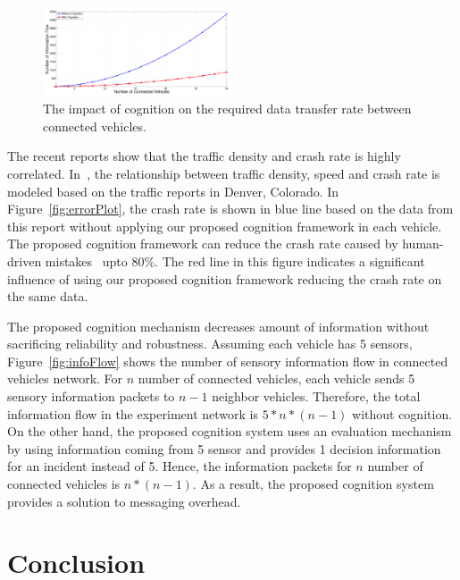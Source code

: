 \documentclass[journal, 11pt]{IEEEtran}
\begin{document}
\begin{figure}[tbh]
  \centering
  \includegraphics[width=0.5\textwidth]{figs/infoFlow.pdf}
  \vspace*{-4mm}
  \caption{{\fontsize{10}{10}\selectfont The impact of cognition on the required
  data transfer rate between connected vehicles.}}
  \label{fig:peactidm}
  \vspace*{-3mm}
\end{figure}

The recent reports show that the traffic density and crash rate is highly
correlated. In~\cite{trb12}, the relationship between traffic density, speed and
crash rate is modeled based on the traffic reports in Denver, Colorado. In
Figure~\ref{fig:errorPlot}, the crash rate is shown in blue line based on the
data from this report without applying our proposed cognition framework in each
vehicle. The proposed cognition framework can reduce the crash rate caused by
human-driven mistakes~\cite[pg. 16]{hardingNHTSA14} upto $80\%$. The red line in
this figure indicates a significant influence of using our proposed cognition
framework reducing the crash rate on the same data.

{\color{red} The proposed cognition mechanism decreases amount of information
without sacrificing reliability and robustness. Assuming each vehicle has 5
sensors, Figure~\ref{fig:infoFlow} shows the number of sensory information flow
in connected vehicles network. For $n$ number of connected vehicles, each
vehicle sends 5 sensory information packets to $n - 1$ neighbor vehicles.
Therefore, the total information flow in the experiment network is $5*n*(n-1)$
without cognition. On the other hand, the proposed cognition system uses an
evaluation mechanism by using information coming from 5 sensor and provides 1
decision information for an incident instead of 5. Hence, the information
packets for $n$ number of connected vehicles is $n*(n-1)$. As a result, the
proposed cognition system provides a solution to messaging overhead.}

\section{Conclusion}
\label{Conc}
%



% 
\end{document}
